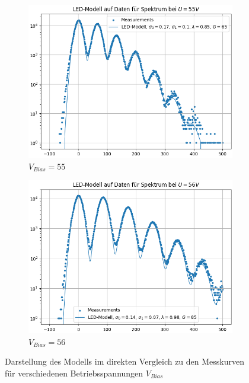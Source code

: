 \documentclass[12pt]{article}
\begin{document}
\begin{figure}[h!]
  \centering
  \begin{subfigure}{0.49\textwidth}
    \includegraphics[width=\textwidth]{Grafiken/model 55}
    \caption{$V_{Bias}=55$}
  \end{subfigure}
  \begin{subfigure}{0.49\textwidth}
    \includegraphics[width=\textwidth]{Grafiken/modell 56}
    \caption{$V_{Bias}=56$}
  \end{subfigure}
  \caption{Darstellung des Modells im direkten Vergleich zu den Messkurven für verschiedenen Betriebsspannungen $V_{Bias}$}
  \label{Modell1}
\end{figure}
\end{document}

